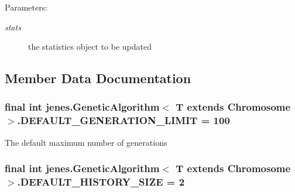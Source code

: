 \begin{Desc}
\item[Parameters:]
\begin{description}
\item[{\em stats}]the statistics object to be updated \end{description}
\end{Desc}


\subsection{Member Data Documentation}
\hypertarget{classjenes_1_1_genetic_algorithm_3_01_t_01extends_01_chromosome_01_4_2492ee1b00f5631a1c1b1c6f15ea3421}{
\subsubsection[DEFAULT\_\-GENERATION\_\-LIMIT]{\setlength{\rightskip}{0pt plus 5cm}final int jenes.GeneticAlgorithm$<$ T extends Chromosome $>$.{\bf DEFAULT\_\-GENERATION\_\-LIMIT} = 100}}
\label{classjenes_1_1_genetic_algorithm_3_01_t_01extends_01_chromosome_01_4_2492ee1b00f5631a1c1b1c6f15ea3421}


The default maximum number of generations \hypertarget{classjenes_1_1_genetic_algorithm_3_01_t_01extends_01_chromosome_01_4_23df2e338c3439d7457ff6a150c573e1}{
\subsubsection[DEFAULT\_\-HISTORY\_\-SIZE]{\setlength{\rightskip}{0pt plus 5cm}final int jenes.GeneticAlgorithm$<$ T extends Chromosome $>$.{\bf DEFAULT\_\-HISTORY\_\-SIZE} = 2}}
\label{classjenes_1_1_genetic_algorithm_3_01_t_01extends_01_chromosome_01_4_23df2e338c3439d7457ff6a150c573e1}


